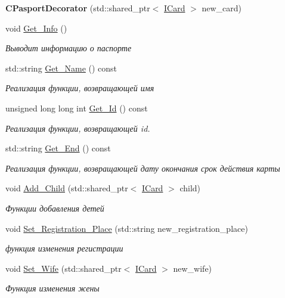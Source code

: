 \begin{DoxyCompactItemize}
\item 
{\bfseries C\+Pasport\+Decorator} (std\+::shared\+\_\+ptr$<$ \hyperlink{classICard}{I\+Card} $>$ new\+\_\+card)\hypertarget{classCPasportDecorator_a90fabb0b36bc79f96b07eb364e034a3c}{}\label{classCPasportDecorator_a90fabb0b36bc79f96b07eb364e034a3c}

\item 
void \hyperlink{classCPasportDecorator_ab02f32110fa20a11c09fcb3bc6e05a9e}{Get\+\_\+\+Info} ()
\begin{DoxyCompactList}\small\item\em Выводит информацию о паспорте \end{DoxyCompactList}\item 
std\+::string \hyperlink{classCPasportDecorator_a5057df68d924b5c8eddf472c0ea1f079}{Get\+\_\+\+Name} () const 
\begin{DoxyCompactList}\small\item\em Реализация функции, возвращающей имя \end{DoxyCompactList}\item 
unsigned long long int \hyperlink{classCPasportDecorator_a48884f3bbb9cb8428dfc1fc03c3b70a1}{Get\+\_\+\+Id} () const 
\begin{DoxyCompactList}\small\item\em Реализация функции, возвращающей id. \end{DoxyCompactList}\item 
std\+::string \hyperlink{classCPasportDecorator_a1e3ea08fd69b0428ef911535a1b3274f}{Get\+\_\+\+End} () const 
\begin{DoxyCompactList}\small\item\em Реализация функции, возвращающей дату окончания срок действия карты \end{DoxyCompactList}\item 
void \hyperlink{classCPasportDecorator_a553525eb997b1879289744a12ae0abff}{Add\+\_\+\+Child} (std\+::shared\+\_\+ptr$<$ \hyperlink{classICard}{I\+Card} $>$ child)
\begin{DoxyCompactList}\small\item\em Функции добавления детей \end{DoxyCompactList}\item 
void \hyperlink{classCPasportDecorator_aa12a6517f0168fe39aa307d037ee3d55}{Set\+\_\+\+Registration\+\_\+\+Place} (std\+::string new\+\_\+registration\+\_\+place)
\begin{DoxyCompactList}\small\item\em функция изменения регистрации \end{DoxyCompactList}\item 
void \hyperlink{classCPasportDecorator_a3d94d976fdf2276bebaf2d21bd3eb55b}{Set\+\_\+\+Wife} (std\+::shared\+\_\+ptr$<$ \hyperlink{classICard}{I\+Card} $>$ new\+\_\+wife)
\begin{DoxyCompactList}\small\item\em Функция изменения жены \end{DoxyCompactList}\end{DoxyCompactItemize}


